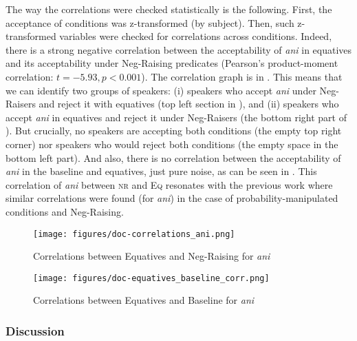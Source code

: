 \documentclass[output=paper,colorlinks,citecolor=brown]{langscibook}
\begin{document}
The way the correlations were checked statistically is the following. First, the acceptance of conditions was z-transformed (by subject). Then, such z-transformed variables were checked for correlations across conditions. Indeed, there is a strong negative correlation between the acceptability of \textit{ani} in equatives and its acceptability under Neg-Raising predicates (Pearson's product-moment correlation: $t = -5.93, p < 0.001$). The correlation graph is in . This means that we can identify two groups of speakers: (i) speakers who accept \textit{ani} under Neg-Raisers and reject it with equatives (top left section in ), and (ii) speakers who accept \textit{ani} in equatives and reject it under Neg-Raisers (the bottom right part of ). But crucially, no speakers are accepting both conditions (the empty top right corner) nor speakers who would reject both conditions (the empty space in the bottom left part). And also, there is no correlation between the acceptability of \textit{ani} in the baseline and equatives, just pure noise, as can be seen in . This correlation of \textit{ani} between \textsc{nr} and \textsc{Eq} resonates with the previous work \citep{docekaldotlacilsubber} where similar correlations were found (for \textit{ani}) in the case of probability-manipulated conditions and Neg-Raising.

\begin{figure}
    \centering
    \caption{Correlations between Equatives and Neg-Raising for \textit{ani}}
    \texttt{[image: figures/doc-correlations\_ani.png]}
    \label{fig-ani-corr}
\end{figure}
  
\begin{figure}
  \caption{Correlations between Equatives and Baseline for \textit{ani}}
  \texttt{[image: figures/doc-equatives\_baseline\_corr.png]}
  \label{fig-ani-bas-corr}
\end{figure}

\subsubsection{Discussion}
\end{document}
